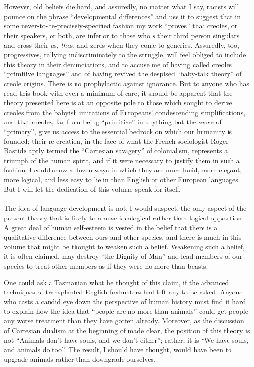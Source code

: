 However, old beliefs die hard, and assuredly, no matter what I say, racists will pounce on the phrase ``developmental differences'' and use it to suggest that in some never-to-be-precisely-specified fashion my work ``proves'' that creoles, or their speakers, or both, are inferior to those who \textit{s} their third person singulars and cross their \textit{a}s, \textit{the}s, and zeros when they come to generics. Assuredly, too, progressives, rallying indiscriminately to the struggle, will feel obliged to include this theory in their denunciations, and to accuse me of having called creoles ``primitive languages'' and of having revived the despised ``baby-talk theory'' of creole origins. There is no prophylactic against ignorance. But to anyone who has read this book with even a minimum of care, it should be apparent that the theory presented here is at an opposite pole to those which sought to derive creoles from the babyish imitations of Europeans' condescending simplifications, and that creoles, far from being ``primitive'' in anything but the sense of ``primary'', give us access to the essential bedrock on which our humanity is founded; their re-creation, in the face of what the French sociologist Roger Bastide aptly termed the ``Cartesian savagery'' of colonialism, represents a triumph of the human spirit, and if it were necessary to justify them in such a fashion, I could show a dozen ways in which they are more lucid, more elegant, more logical, and less easy to lie in than English or other European languages. But I will let the dedication of this volume speak for itself.\\\\

The idea of language development is not, I would suspect, the only aspect of the present theory that is likely to arouse ideological rather than logical opposition. A great deal of human self-esteem is vested in the belief that there is a qualitative difference between ours and other species, and there is much in this volume that might be thought to weaken such a belief. Weakening such a belief, it is often claimed, may destroy ``the Dignity of Man'' and lead members of our species to treat other members as if they were no more than beasts.

One could ask a Tasmanian what he thought of this claim, if the advanced techniques of transplanted English foxhunters had
left any  to be asked. Anyone who casts a candid eye down the perspective of human history must find it hard to explain how the idea that ``people are no more than animals'' could get people any worse treatment than they have gotten already. Moreover, as the discussion of Cartesian dualism at the beginning of  made clear, the position of this theory is not ``Animals don't have souls, and we don't either''; rather, it is ``We have souls, and animals do too''. The result, I should have thought, would have been to upgrade animals rather than downgrade ourselves.

